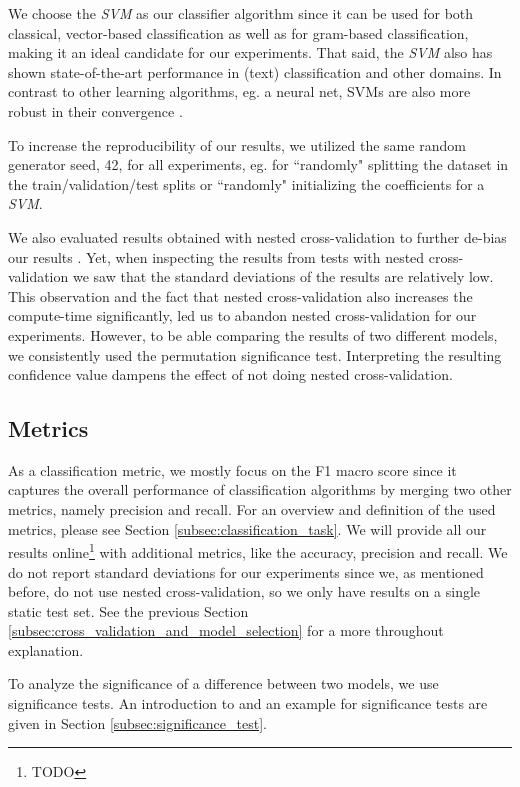 We choose the \textit{SVM} as our classifier algorithm since it can be used for both classical, vector-based classification as well as for gram-based classification, making it an ideal candidate for our experiments.
That said, the \textit{SVM} also has shown state-of-the-art performance in (text) classification and other domains.
In contrast to other learning algorithms, eg. a neural net, SVMs are also more robust in their convergence \cite{Joachims1998}.

To increase the reproducibility of our results, we utilized the same random generator seed, 42, for all experiments, eg. for ``randomly" splitting the dataset in the train/validation/test splits or ``randomly" initializing the coefficients for a \textit{SVM}.

We also evaluated results obtained with nested cross-validation to further de-bias our results \cite{Varma2006}. Yet, when inspecting the results from tests with nested cross-validation we saw that the standard deviations of the results are relatively low.
This observation and the fact that nested cross-validation also increases the compute-time significantly, led us to abandon nested cross-validation for our experiments.
However, to be able comparing the results of two different models, we consistently used the permutation significance test. 
Interpreting the resulting confidence value dampens the effect of not doing nested cross-validation.


\subsection{Metrics}
As a classification metric, we mostly focus on the F1 macro score since it captures the overall performance of classification algorithms by merging two other metrics, namely precision and recall.
For an overview and definition of the used metrics, please see Section \ref{subsec:classification_task}.
We will provide all our results online\footnote{TODO} with additional metrics, like the accuracy, precision and recall.
We do not report standard deviations for our experiments since we, as mentioned before, do not use nested cross-validation, so we only have results on a single static test set.
See the previous Section \ref{subsec:cross_validation_and_model_selection} for a more throughout explanation.

To analyze the significance of a difference between two models, we use significance tests.
An introduction to and an example for significance tests are given in Section \ref{subsec:significance_test}.

